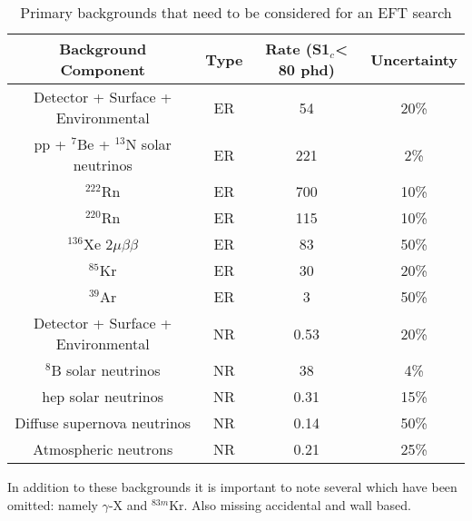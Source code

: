 \begin{table}[]
    \centering
    \begin{tabular}{c|c|c|c}
        Background Component                         & Type    & Rate (S1$_c$< 80 phd)    & Uncertainty  \\ \hline
        Detector + Surface + Environmental           & ER      & 54                       & 20\% \cite{LZ_projected_sensitivity_paper_ref}        \\
        pp + ${}^{7}$Be + ${}^{13}$N solar neutrinos & ER      & 221                      & 2\% \cite{pp_solar_neutrinos_rate_ref}       \\
        ${}^{222}$Rn                                 & ER      & 700                      & 10\%         \\
        ${}^{220}$Rn                                 & ER      & 115                      & 10\%         \\
        ${}^{136}$Xe 2$\mu\beta\beta$                & ER      & 83                       & 50\% \cite{double_beta_decay_rate_ref}        \\
        ${}^{85}$Kr                                  & ER      & 30                       & 20\%          \\
        ${}^{39}$Ar                                  & ER      & 3                        & 50\%         \\
        Detector + Surface + Environmental           & NR      & 0.53                     & 20\% \cite{LZ_projected_sensitivity_paper_ref}         \\
        ${}^{8}$B solar neutrinos                    & NR      & 38                       & 4\%         \\
        hep solar neutrinos                          & NR      & 0.31                     & 15\%         \\
        Diffuse supernova neutrinos                  & NR      & 0.14                     & 50\%         \\
        Atmospheric neutrons                         & NR      & 0.21                     & 25\%       
    \end{tabular}
    \caption{Primary backgrounds that need to be considered for an EFT search}
    \label{tab:projected_lz_backgrounds}
\end{table}

\par
In addition to these backgrounds it is important to note several which have been omitted: namely $\gamma$-X and ${}^{83m}$Kr.
Also missing accidental and wall based.

